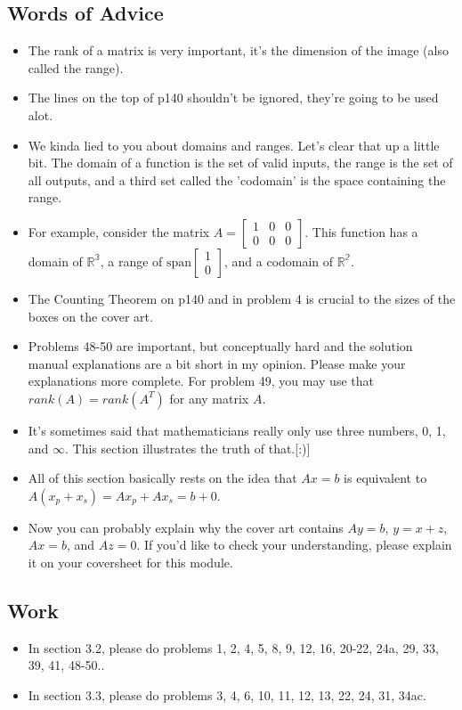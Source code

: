 	\subsection{Words of Advice}
		\begin{itemize}
			\item The rank of a matrix is very important, it's the dimension of the image (also called the range).
			\item The lines on the top of p140 shouldn't be ignored, they're going to be used alot.
			\item We kinda lied to you about domains and ranges. Let's clear that up a little bit. The domain of a function is the set of valid inputs, the range is the set of all outputs, and a third set called the 'codomain' is the space containing the range.
			\item For example, consider the matrix $A = \begin{bmatrix} 1 & 0 & 0\\ 0 & 0 &0 \end{bmatrix}$. This function has a domain of $\mathbb{R^3}$, a range of $\text{span}\begin{bmatrix} 1\\0 \end{bmatrix}$, and a codomain of $\mathbb{R^2}$.
			\item The Counting Theorem on p140 and in problem 4 is crucial to the sizes of the boxes on the cover art.
			\item Problems 48-50 are important, but conceptually hard and the solution manual explanations are a bit short in my opinion. Please make your explanations more complete. For problem 49, you may use that $rank(A) = rank(A^T)$ for any matrix $A$.
			\item It's sometimes said that mathematicians really only use three numbers, 0, 1, and $\infty$. This section illustrates the truth of that.[:)]
			\item All of this section basically rests on the idea that $Ax= b$ is equivalent to $A(x_p+x_s) = Ax_p +Ax_s = b + 0$.
			\item Now you can probably explain why the cover art contains $Ay = b$, $y=x+z$, $Ax= b$, and $Az=0$. If you'd like to check your understanding, please explain it on your coversheet for this module.
		\end{itemize}

	\subsection{Work}
		\begin{itemize}
			\item In section 3.2, please do problems 1, 2, 4, 5, 8, 9, 12, 16, 20-22, 24a, 29, 33, 39, 41, 48-50..
			\item In section 3.3, please do problems 3, 4, 6, 10, 11, 12, 13, 22, 24, 31, 34ac.
		\end{itemize}

